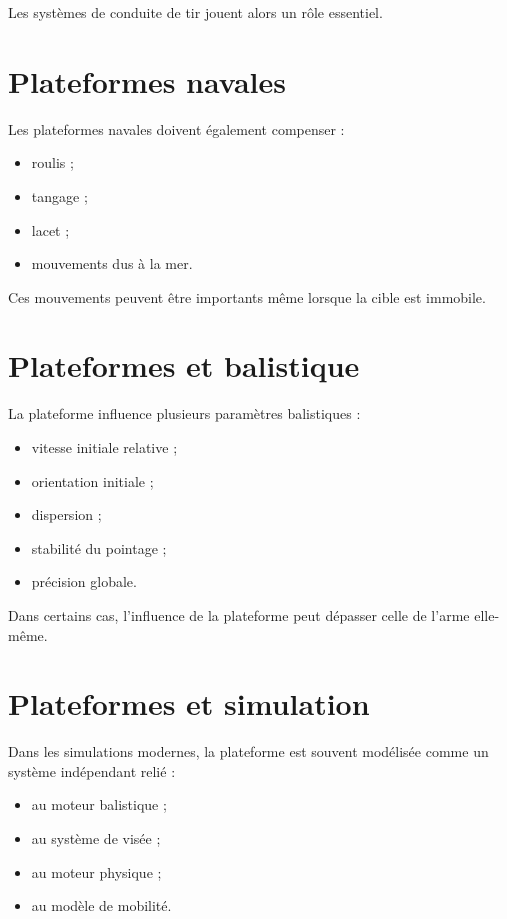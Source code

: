 Les systèmes de conduite de tir jouent alors un rôle essentiel.

\section{Plateformes navales}

Les plateformes navales doivent également compenser :

\begin{itemize}
    \item roulis ;
    \item tangage ;
    \item lacet ;
    \item mouvements dus à la mer.
\end{itemize}

Ces mouvements peuvent être importants même lorsque la cible est immobile.

\section{Plateformes et balistique}

La plateforme influence plusieurs paramètres balistiques :

\begin{itemize}
    \item vitesse initiale relative ;
    \item orientation initiale ;
    \item dispersion ;
    \item stabilité du pointage ;
    \item précision globale.
\end{itemize}

Dans certains cas, l'influence de la plateforme peut dépasser celle de
l'arme elle-même.

\section{Plateformes et simulation}

Dans les simulations modernes, la plateforme est souvent modélisée comme un
système indépendant relié :

\begin{itemize}
    \item au moteur balistique ;
    \item au système de visée ;
    \item au moteur physique ;
    \item au modèle de mobilité.
\end{itemize}

